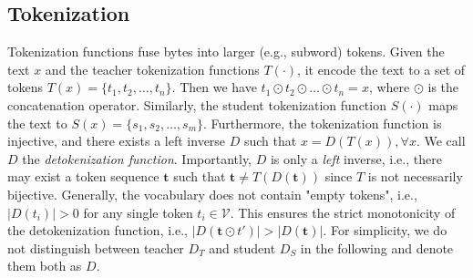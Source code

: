 \documentclass{article}
\theoremstyle{plain}
\theoremstyle{definition}
\theoremstyle{remark}
\begin{document}
\subsection{Tokenization} Tokenization functions fuse bytes into larger (e.g., subword) tokens. Given the text $x$ and the teacher tokenization functions $T(\cdot)$, it encode the text to a set of tokens $T(x) = \{t_1, t_2, \dotsc,t_n\}$. Then we have $t_1\odot t_2 \odot \dotsc \odot t_n = x$, where $\odot$ is the concatenation operator.  Similarly, the student tokenization function $S(\cdot)$ maps the text to $S(x) = \{s_1, s_2, \dotsc, s_m\}$.  Furthermore, the tokenization function is injective, and there exists a left inverse $D$ such that $x = D(T(x)),\forall x$. We call $D$ the \textit{detokenization function}. Importantly, $D$ is only a \textit{left} inverse, i.e., there may exist a token sequence $\bm{t}$ such that $\bm{t} \neq T(D(\bm{t}))$ since $T$ is not necessarily bijective. Generally, the vocabulary does not contain "empty tokens", i.e., $|D(t_i)| > 0$ for any single token $t_i \in \mathcal{V}$. This ensures the strict monotonicity of the detokenization function, i.e., $|D(\bm{t} \odot t')| > |D(\bm{t})|$. For simplicity, we do not distinguish between teacher $D_T$ and student $D_S$ in the following and denote them both as $D$.
\end{document}
